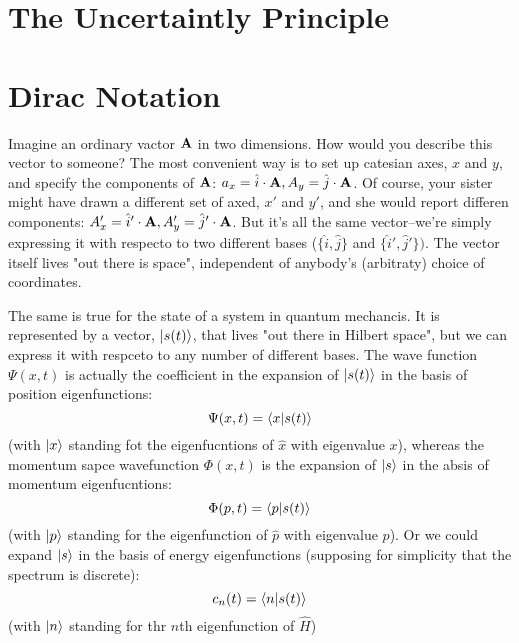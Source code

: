 \section{The Uncertaintly Principle}

\section{Dirac Notation}
Imagine an ordinary vactor $\vb{A}$ in two dimensions. How would you describe this vector to someone? The most convenient way is to set up catesian axes, $x$ and $y$, and specify the components of $\vb{A}$: $a_x=\hat{i}\cdot \vb{A}, A_y=\hat{j}\cdot \vb{A}$. Of course, your sister might have drawn a different set of axed, $x'$ and $y'$, and she would report differen components: $A'_x=\hat{i}'\cdot\vb{A}, A'_y=\hat{j}'\cdot\vb{A}$. But it's all the same vector--we're simply expressing it with respecto to two different bases ($\{\hat{i},\hat{j}\}$ and $\{\hat{i}',\hat{j}'\})$. The vector itself lives "out there is space", independent of anybody's (arbitraty) choice of coordinates.

The same is true for the state of a system in quantum mechancis. It is represented by a vector, $\ket{s(t)}$, that lives "out there in Hilbert space", but we can express it with respceto to any number of different bases. The wave function $\Psi(x,t)$ is actually the coefficient in the expansion of $\ket{s(t)}$ in the basis of position eigenfunctions:
\begin{equation}\label{3.75}
	\Psi(x,t)=\braket{x}{s(t)}
\end{equation}
(with $\ket{x}$ standing fot the eigenfucntions of $\hat{x}$ with eigenvalue $x$), whereas the momentum sapce wavefunction $\Phi(x,t)$ is the expansion of $\ket{s}$ in the absis of momentum eigenfucntions:
\begin{equation}\label{3.76}
	\Phi(p,t)=\braket{p}{s(t)}
\end{equation}
(with $\ket{p}$ standing for the eigenfunction of $\hat{p}$ with eigenvalue $p$). Or we could expand $\ket{s}$ in the basis of energy eigenfunctions (supposing for simplicity that the spectrum is discrete):
\begin{equation}\label{3.77}
	c_n(t)=\braket{n}{s(t)}
\end{equation}
(with $\ket{n}$ standing for thr $n$th eigenfunction of $\hat{H}$)


























